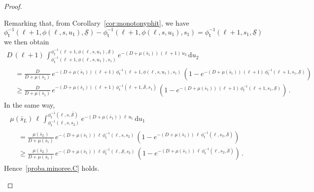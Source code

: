 \documentclass[10pt]{amsart}
\theoremstyle{definition}\newtheorem{defi}[theo]{Definition}\newtheorem{rema}[theo]{Remark}\newtheorem{exam}[theo]{Example}\newtheorem{exem}[theo]{Example}\newtheorem{nota}[theo]{Notation}
\newcommand{\dif}{\mathrm{d}}
\newcommand{\Smin}{\underline{\mathcal{S}}}
\newcommand{\Smax}{\bar{\mathcal{S}}}
\newcommand{\barmu}{\mu(\bar s_1)}
\newcommand{\phit}{\phi_\textsf{t}^{-1}}
\newcommand{\1}{\mathbf{1}}
\begin{document}
\begin{proof}
\begin{itemize}
Remarking that, from Corollary~\ref{cor:monotonyphit}, we have
\[
\phit(\ell+1,\phi(\ell,s,u_1),\Smin)-\phit(\ell+1,\phi(\ell,s,u_1),s_1)=\phit(\ell+1,s_1,\Smin)
\]
we then obtain
\begin{multline*}
D\,(\ell+1)\,
\int_{\phit(\ell+1,\phi(\ell,s,u_1),s_1)}^{\phit(\ell+1,\phi(\ell,s,u_1),\Smin)} e^{-(D+\barmu)\,(\ell+1)\,u_2}\,\dif u_2
\\
\begin{aligned}
& =
\frac{D}{D+\barmu}\,e^{-(D+\barmu)\,(\ell+1)\,\phit\left(\ell+1,\phi(\ell,s,u_1),s_1\right)}\,
\left(1-e^{-(D+\barmu)\,(\ell+1)\,\phit(\ell+1,s_1,\Smin)}\right)
\\
& \geq
\frac{D}{D+\barmu}\,e^{-(D+\barmu)\,(\ell+1)\,\phit(\ell+1,\Smax,s_1)}\,
\left(1-e^{-(D+\barmu)\,(\ell+1)\,\phit(\ell+1,s_1,\Smin)}\right)\,.
\end{aligned}
\end{multline*}
In the same way,
\begin{multline*}
\mu(\bar s_L) \,\ell\,
\int_{\phit\left(\ell,s,s_2\right)}^{\phit\left(\ell,s,\Smax\right)} e^{-(D+\barmu)\,\ell\,u_1}\,\dif u_1
\\
\begin{aligned}
&=
\frac{\mu(\bar s_L)}{D+\barmu}\,e^{-(D+\barmu)\,\ell\,\phit(\ell,s,s_2)}\,
\left(1-e^{-(D+\barmu)\,\ell\,\phit(\ell,s_2,\Smax)}\right)
\\
&\geq
\frac{\mu(\bar s_L)}{D+\barmu}\,e^{-(D+\barmu)\,\ell\,\phit(\ell,\Smin,s_2)}\,
\left(1-e^{-(D+\barmu)\,\ell\,\phit(\ell,s_2,\Smax)}\right)\,.
\end{aligned}
\end{multline*}
Hence~\eqref{proba.minoree.C} holds.




\end{itemize}
\end{proof}
\end{document}
